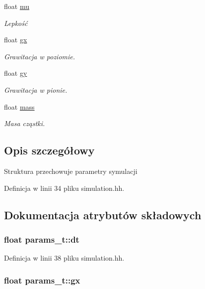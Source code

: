 \begin{DoxyCompactItemize}
float \hyperlink{structparams__t_a971359c29b2f946b477e4a1b3605fa3f}{mu}
\begin{DoxyCompactList}\small\item\em Lepkość \end{DoxyCompactList}\item 
float \hyperlink{structparams__t_a9f3f70c0cdedcb053c9d45c2e41e67b6}{gx}
\begin{DoxyCompactList}\small\item\em Grawitacja w poziomie. \end{DoxyCompactList}\item 
float \hyperlink{structparams__t_a0da484b4cc6a542875aa7b92e200f507}{gy}
\begin{DoxyCompactList}\small\item\em Grawitacja w pionie. \end{DoxyCompactList}\item 
float \hyperlink{structparams__t_afe4a59fe43565a71a0a7a155714e2af1}{mass}
\begin{DoxyCompactList}\small\item\em Masa cząstki. \end{DoxyCompactList}\end{DoxyCompactItemize}


\subsection{Opis szczegółowy}
Struktura przechowuje parametry symulacji 

Definicja w linii 34 pliku simulation.\-hh.



\subsection{Dokumentacja atrybutów składowych}
\hypertarget{structparams__t_a81fc6596e9b1446442ebf3eef2c3fb01}{
\subsubsection[{dt}]{\setlength{\rightskip}{0pt plus 5cm}float params\-\_\-t\-::dt}}\label{structparams__t_a81fc6596e9b1446442ebf3eef2c3fb01}


Definicja w linii 38 pliku simulation.\-hh.

\hypertarget{structparams__t_a9f3f70c0cdedcb053c9d45c2e41e67b6}{
\subsubsection[{gx}]{\setlength{\rightskip}{0pt plus 5cm}float params\-\_\-t\-::gx}}\label{structparams__t_a9f3f70c0cdedcb053c9d45c2e41e67b6}


